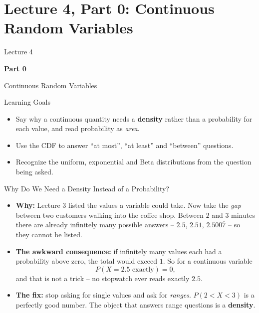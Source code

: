 \section{Lecture 4, Part 0: Continuous Random Variables}

\begin{frame}
\vfill
\centering
{\color{RLBlue}\large Lecture 4}

\vspace{0.3em}
{\color{RLBlue}\Large\bfseries Part 0}

\vspace{0.6em}
{\Large Continuous Random Variables}
\vfill
\end{frame}

\begin{frame}{Learning Goals}
\begin{itemize}
  \item Say why a continuous quantity needs a \textbf{density} rather than a probability for each value, and read probability as \emph{area}.
  \pause
  \item Use the CDF to answer ``at most'', ``at least'' and ``between'' questions.
  \pause
  \item Recognize the uniform, exponential and Beta distributions from the question being asked.
\end{itemize}
\end{frame}

\begin{frame}{Why Do We Need a Density Instead of a Probability?}
\begin{itemize}
  \item \textbf{Why:} Lecture 3 listed the values a variable could take. Now take the \emph{gap} between two customers walking into the coffee shop. Between $2$ and $3$ minutes there are already infinitely many possible answers -- $2.5$, $2.51$, $2.500\overline{7}$ -- so they cannot be listed.
  \pause
  \item \textbf{The awkward consequence:} if infinitely many values each had a probability above zero, the total would exceed $1$. So for a continuous variable
  \[
    P(X = 2.5 \text{ exactly}) = 0 ,
  \]
  and that is not a trick -- no stopwatch ever reads exactly $2.5$.
  \pause
  \item \textbf{The fix:} stop asking for single values and ask for \emph{ranges}. $P(2 < X < 3)$ is a perfectly good number. The object that answers range questions is a \textbf{density}.
\end{itemize}
\end{frame}


